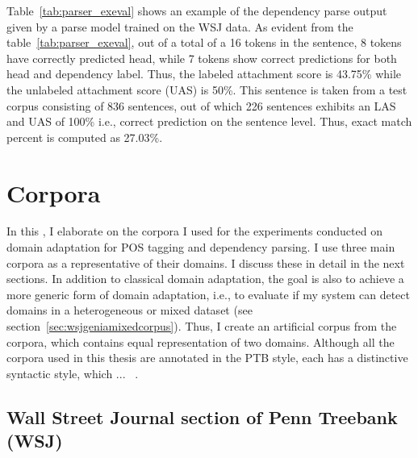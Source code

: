 Table~\ref{tab:parser_exeval} shows an example of the dependency parse output given by a parse model trained on the WSJ data. 
As evident from the table~\ref{tab:parser_exeval}, out of a total of a 16 tokens in the sentence, 8 tokens have correctly predicted head, while 7 tokens show correct predictions for both head and dependency label. Thus, the labeled attachment score is 43.75\% while the unlabeled attachment score (UAS) is 50\%. This sentence is taken from a test corpus consisting of 836 sentences, out of which 226 sentences exhibits an LAS and UAS of 100\% i.e., correct prediction on the sentence level. Thus, exact match percent is computed as 27.03\%. 


\section{Corpora}

In this , I elaborate on the corpora I used for the experiments conducted on domain adaptation for POS tagging and dependency parsing. I use three main corpora as a representative of their domains. I discuss these in detail in the next sections. In addition to classical domain adaptation, the goal is also to achieve a more generic form of domain adaptation, i.e., to evaluate if my system can detect domains in a heterogeneous or mixed dataset (see section~\ref{sec:wsjgeniamixedcorpus}). Thus, I create an artificial corpus from the corpora, which contains equal representation of two domains. Although all the corpora used in this thesis are annotated in the PTB style, each has a distinctive syntactic style, which ... ~.

  
\subsection{Wall Street Journal section of Penn Treebank (WSJ)}

